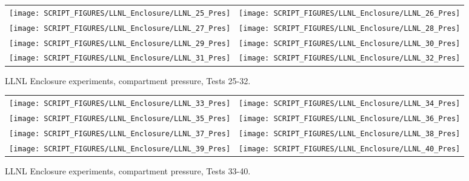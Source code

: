 \begin{figure}[p]
\begin{tabular*}{\textwidth}{l@{\extracolsep{\fill}}r}
\texttt{[image: SCRIPT\_FIGURES/LLNL\_Enclosure/LLNL\_25\_Pres]} &
\texttt{[image: SCRIPT\_FIGURES/LLNL\_Enclosure/LLNL\_26\_Pres]} \\
\texttt{[image: SCRIPT\_FIGURES/LLNL\_Enclosure/LLNL\_27\_Pres]} &
\texttt{[image: SCRIPT\_FIGURES/LLNL\_Enclosure/LLNL\_28\_Pres]} \\
\texttt{[image: SCRIPT\_FIGURES/LLNL\_Enclosure/LLNL\_29\_Pres]} &
\texttt{[image: SCRIPT\_FIGURES/LLNL\_Enclosure/LLNL\_30\_Pres]} \\
\texttt{[image: SCRIPT\_FIGURES/LLNL\_Enclosure/LLNL\_31\_Pres]} &
\texttt{[image: SCRIPT\_FIGURES/LLNL\_Enclosure/LLNL\_32\_Pres]}
\end{tabular*}
\caption{LLNL Enclosure experiments, compartment pressure, Tests 25-32.}
\label{LLNL_Enclosure_Pres_4}
\end{figure}

\begin{figure}[p]
\begin{tabular*}{\textwidth}{l@{\extracolsep{\fill}}r}
\texttt{[image: SCRIPT\_FIGURES/LLNL\_Enclosure/LLNL\_33\_Pres]} &
\texttt{[image: SCRIPT\_FIGURES/LLNL\_Enclosure/LLNL\_34\_Pres]} \\
\texttt{[image: SCRIPT\_FIGURES/LLNL\_Enclosure/LLNL\_35\_Pres]} &
\texttt{[image: SCRIPT\_FIGURES/LLNL\_Enclosure/LLNL\_36\_Pres]} \\
\texttt{[image: SCRIPT\_FIGURES/LLNL\_Enclosure/LLNL\_37\_Pres]} &
\texttt{[image: SCRIPT\_FIGURES/LLNL\_Enclosure/LLNL\_38\_Pres]} \\
\texttt{[image: SCRIPT\_FIGURES/LLNL\_Enclosure/LLNL\_39\_Pres]} &
\texttt{[image: SCRIPT\_FIGURES/LLNL\_Enclosure/LLNL\_40\_Pres]}
\end{tabular*}
\caption{LLNL Enclosure experiments, compartment pressure, Tests 33-40.}
\label{LLNL_Enclosure_Pres_5}
\end{figure}

